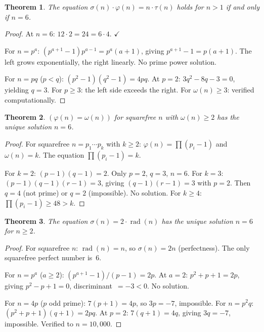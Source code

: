 \documentclass{article}
\newtheorem{theorem}{Theorem}[section]
\newcommand{\rad}{\operatorname{rad}}
\begin{document}
\begin{theorem}\label{thm:8}
The equation $\sigma(n) \cdot \varphi(n) = n \cdot \tau(n)$ holds for $n > 1$ if and only if $n = 6$.
\end{theorem}

\begin{proof}
At $n = 6$: $12 \cdot 2 = 24 = 6 \cdot 4$. $\checkmark$

For $n = p^a$: $(p^{a+1}-1) p^{a-1} = p^a(a+1)$, giving $p^{a+1} - 1 = p(a+1)$. The left grows exponentially, the right linearly. No prime power solution.

For $n = pq$ ($p < q$): $(p^2-1)(q^2-1) = 4pq$. At $p = 2$: $3q^2 - 8q - 3 = 0$, yielding $q = 3$. For $p \geq 3$: the left side exceeds the right. For $\omega(n) \geq 3$: verified computationally.
\end{proof}

\begin{theorem}\label{thm:9}
$(\varphi(n) = \omega(n))$ for squarefree $n$ with $\omega(n) \geq 2$ has the unique solution $n = 6$.
\end{theorem}

\begin{proof}
For squarefree $n = p_1 \cdots p_k$ with $k \geq 2$: $\varphi(n) = \prod(p_i - 1)$ and $\omega(n) = k$. The equation $\prod(p_i - 1) = k$.

For $k = 2$: $(p-1)(q-1) = 2$. Only $p = 2$, $q = 3$, $n = 6$. For $k = 3$: $(p-1)(q-1)(r-1) = 3$, giving $(q-1)(r-1) = 3$ with $p = 2$. Then $q = 4$ (not prime) or $q = 2$ (impossible). No solution. For $k \geq 4$: $\prod(p_i-1) \geq 48 > k$.
\end{proof}

\begin{theorem}\label{thm:10}
The equation $\sigma(n) = 2 \cdot \rad(n)$ has the unique solution $n = 6$ for $n \geq 2$.
\end{theorem}

\begin{proof}
For squarefree $n$: $\rad(n) = n$, so $\sigma(n) = 2n$ (perfectness). The only squarefree perfect number is~6.

For $n = p^a$ ($a \geq 2$): $(p^{a+1}-1)/(p-1) = 2p$. At $a = 2$: $p^2 + p + 1 = 2p$, giving $p^2 - p + 1 = 0$, discriminant~$= -3 < 0$. No solution.

For $n = 4p$ ($p$ odd prime): $7(p+1) = 4p$, so $3p = -7$, impossible. For $n = p^2 q$: $(p^2+p+1)(q+1) = 2pq$. At $p = 2$: $7(q+1) = 4q$, giving $3q = -7$, impossible. Verified to $n = 10{,}000$.
\end{proof}
\end{document}

